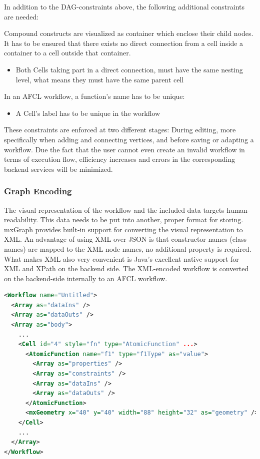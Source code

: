 \documentclass[a4paper,top=25mm,bottom=25mm,12pt,pdftex,halfparskip,twoside,bibtotoc,numbers=noenddot]{scrbook}
\begin{document}
In addition to the DAG-constraints above, the following additional constraints are needed:

Compound constructs are visualized as container which enclose their child nodes. It has to be ensured that there exists no direct connection from a cell inside a container to a cell outside that container.
\begin{itemize}
	\item Both \textsf{Cell}s taking part in a direct connection, must have the same nesting level, what means they must have the same parent cell
\end{itemize}
In an AFCL workflow, a function's name has to be unique:
\begin{itemize}
	\item A \textsf{Cell}'s label has to be unique in the workflow
\end{itemize}

These constraints are enforced at two different stages: During editing, more specifically when adding and connecting vertices, and before saving or adapting a workflow.
Due the fact that the user cannot even create an invalid workflow in terms of execution flow, efficiency increases and errors in the corresponding backend services will be minimized.


\subsubsection{Graph Encoding}

The visual representation of the workflow and the included data targets human-readability. This data needs to be put into another, proper format for storing. mxGraph provides built-in support for converting the visual representation to XML. An advantage of using XML over JSON is that constructor names (class names) are mapped to the XML node names, no additional property is required.
What makes XML also very convenient is Java's excellent native support for XML and XPath on the backend side. The XML-encoded workflow is converted on the backend-side internally to an AFCL workflow.

\begin{lstlisting}[language=XML,caption={Example of a XML-encoded Workflow.},label={lst:xml-workflow-example}]
<Workflow name="Untitled">
  <Array as="dataIns" />
  <Array as="dataOuts" />
  <Array as="body">
    ...
    <Cell id="4" style="fn" type="AtomicFunction" ...>
      <AtomicFunction name="f1" type="f1Type" as="value">
        <Array as="properties" />
        <Array as="constraints" />
        <Array as="dataIns" />
        <Array as="dataOuts" />
      </AtomicFunction>
      <mxGeometry x="40" y="40" width="88" height="32" as="geometry" />
    </Cell>
    ...
  </Array>
</Workflow>
\end{lstlisting}
\end{document}
